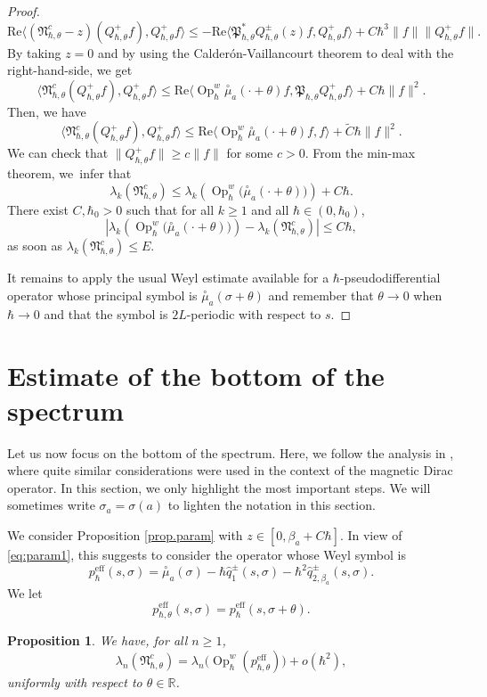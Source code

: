 \documentclass[10pt]{amsart}
\newcommand{\eff}{\mathrm{eff}}
\DeclareMathOperator{\Op}{Op}
\theoremstyle{plain}
\newtheorem{proposition}[theorem]{Proposition}
\theoremstyle{definition}
\renewcommand{\Re}{\mathrm{Re}}
\begin{document}
\begin{proof}
\[
\Re\langle(\mathfrak{N}^c_{\hbar,\theta}-z)(Q^+_{\hbar,\theta}f),Q^+_{\hbar,\theta}f\rangle\leq -\Re\langle \mathfrak{P}^*_{\hbar,\theta}Q^\pm_{\hbar,\theta}(z)f,Q^+_{\hbar,\theta}f\rangle+C\hbar^3\|f\|\|Q^+_{\hbar,\theta}f\|.
\]
By taking $z=0$ and by using the Calderón-Vaillancourt theorem to deal with the right-hand-side, we get
\[
\langle\mathfrak{N}^c_{\hbar,\theta}(Q^+_{\hbar,\theta}f),Q^+_{\hbar,\theta}f\rangle\leq \Re\langle \Op^w_\hbar\overset{\circ}{\mu}_a(\cdot+\theta)f,\mathfrak{P}_{\hbar,\theta}Q^+_{\hbar,\theta}f\rangle+C\hbar\|f\|^2.
\]
Then, we have
\[
\langle\mathfrak{N}^c_{\hbar,\theta}(Q^+_{\hbar,\theta}f),Q^+_{\hbar,\theta}f\rangle\leq \Re\langle \Op^w_\hbar\overset{\circ}{\mu}_a(\cdot+\theta)f,f\rangle+\tilde C\hbar\|f\|^2.
\]
We can check that $\|Q^+_{\hbar,\theta}f\|\geq c\|f\|$ for some $c>0$.
From the min-max theorem, we~infer that
\[
\lambda_k(\mathfrak{N}^c_{\hbar,\theta})\leq \lambda_k\left(\Op^w_\hbar\bigl(\overset{\circ}{\mu}_a(\cdot+\theta)\bigr)\right)+C\hbar.
\]
There exist $C,\hbar_0>0$ such that for all $k\geq 1$ and all $\hbar\in(0,\hbar_0)$,
\[
\left|\lambda_k\left(\Op^w_\hbar\bigl(\overset{\circ}{\mu}_a(\cdot+\theta)\bigr)\right)- \lambda_k(\mathfrak{N}^c_{\hbar,\theta})\right|\leq C\hbar,
\]
as soon as $\lambda_k(\mathfrak{N}^c_{\hbar,\theta})\leq E$.

It remains to apply the usual Weyl estimate available for a $\hbar$-pseudodifferential operator whose principal symbol is $\overset{\circ}{\mu}_a(\sigma+\theta)$ and remember that $\theta\to0$ when $\hbar\to 0$ and that the symbol is $2L$-periodic with respect to $s$.
\end{proof}

\section{Estimate of the bottom of the spectrum}\label{sec:proofs}
Let us now focus on the bottom of the spectrum. Here, we follow the analysis in \cite[\S 8.3]{BLTRS21}, where quite similar considerations were used in the context of the magnetic Dirac operator. In this section, we only highlight the most important steps.
We will sometimes write $\sigma_a=\sigma(a)$ to lighten the notation in this section.

We consider Proposition \ref{prop.param} with $z\in[0,\beta_a+C\hbar]$. In view of \eqref{eq:param1}, this suggests to consider the operator whose Weyl symbol is
\begin{equation}\label{eq.exp.eff-symb}
p^{\eff}_\hbar(s,\sigma)=\overset{\circ}{\mu}_a(\sigma)-\hbar \hat q_{1}^\pm(s,\sigma)-\hbar^2\hat q_{2,\beta_a}^\pm(s,\sigma).
\end{equation}
We let
\[
p^{\eff}_{\hbar,\theta}(s,\sigma)= p^{\eff}_\hbar(s,\sigma + \theta).
\]
\begin{proposition}\label{prop.Nc-eff}
We have, for all $n\geq 1$,
\[
\lambda_n(\mathfrak{N}^c_{\hbar,\theta})=\lambda_n\bigl(\Op^w_\hbar (p^{\eff}_{\hbar,\theta})\bigr)+o(\hbar^{2}),
\]
uniformly with respect to $\theta\in\mathbb{R}$. 
\end{proposition}
\end{document}
